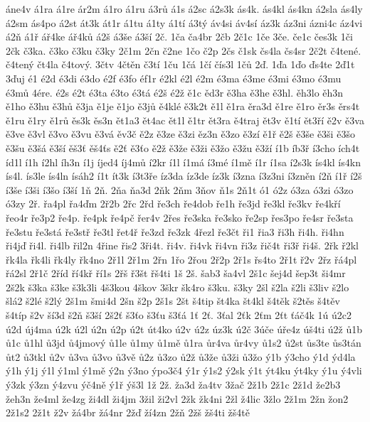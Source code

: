 {áne4v
á1ra
á1re
ár2m
á1ro
á1ru
á3rů
á1s
á2sc
á2s3k
ás4k.
ás4kl
ás4kn
á2sla
ás4ly
á2sm
ás4po
á2st
át3k
át1r
á1tu
á1ty
á1tí
á3tý
áv4si
áv4sí
áz3k
áz3ni
ázni4c
áz4vi
á2ň
á1ř
ář4ke
ář4ků
á2š
á3še
á3ší
2č.
1ča
ča4br
2čb
2č1c
1če
3če.
če1c
čes3k
1či
2čk
č3ka.
č3ko
č3ku
č3ky
2č1m
2čn
č2ne
1čo
č2p
2čs
č1sk
čs4la
čs4sr
2č2t
č4tené.
č4tený
čt4la
č4tový.
3čtv
4čtěn
č3tí
1ču
1čá
1čí
čís3l
1čů
2ď.
1ďa
1ďo
ďs4te
2ď1t
3ďuj
é1
é2d
é3di
é3do
é2f
é3fo
éf1r
é2kl
é2l
é2m
é3ma
é3me
é3mi
é3mo
é3mu
é3mů
4ére.
é2s
é2t
é3ta
é3to
é3tá
é2š
é2ž
ě1c
ěd3r
ě3ha
ě3he
ě3hl.
ěh3lo
ěh3n
ě1ho
ě3hu
ě3hů
ě3ja
ě1je
ě1jo
ě3jů
ě4klé
ě3k2t
ě1l
ě1ra
ěra3d
ě1re
ě1ro
ěr3s
ěrs4t
ě1ru
ě1ry
ě1rů
ěs3k
ěs3n
ět1a3
ět4ac
ět1l
ě1tr
ět3ra
ě4traj
ět3v
ě1tí
ět3ří
ě2v
ě3va
ě3ve
ě3vl
ě3vo
ě3vu
ě3vá
ěv3č
ě2z
ě3ze
ě3zi
ěz3n
ě3zo
ě3zí
ě1ř
ě2š
ě3še
ě3ši
ě3šo
ě3šu
ě3šá
ě3ší
ěš3ť
ěš4ťs
ě2ť
ě3ťo
ě2ž
ě3že
ě3ži
ě3žo
ě3žu
ě3ží
í1b
íb3ř
í3cho
ích4t
íd1l
í1h
í2hl
íh3n
í1j
íjed4
íj4mů
í2kr
í1l
í1má
í3mé
í1mě
í1r
í1sa
í2s3k
ís4kl
ís4kn
ís4l.
ís3le
ís4ln
ísáh2
í1t
ít3k
í3t3ře
íz3da
íz3de
íz3k
í3zna
í3z3ni
í3zněn
í2ň
í1ř
í2š
í3še
í3ši
í3šo
í3ší
1ň
2ň.
2ňa
ňa3d
2ňk
2ňm
3ňov
ň1s
2ň1t
ó1
ó2z
ó3za
ó3zi
ó3zo
ó3zy
2ř.
řa4pl
řa4ďm
2ř2b
2řc
2řd
ře3ch
ře4dob
ře1h
ře3jd
ře3kl
ře3kv
ře4kří
řeo4r
ře3p2
ře4p.
ře4pk
ře4pč
řer4v
2řes
ře3ska
ře3sko
ře2sp
řes3po
ře4sr
ře3sta
ře3stu
ře3stá
ře3stř
ře3tl
řet4ř
ře3zd
ře3zk
4řezl
ře3čt
ři1
řia3
ři3h
ři4h.
ři4hn
ři4jď
ři4l.
ři4lb
řil2n
4řine
řis2
3ři4t.
ři4v.
ři4vk
ři4vn
ři3z
řič4t
ři3ř
ři4š.
2řk
ř2kl
řk4la
řk4li
řk4ly
řk4no
2ř1l
2ř1m
2řn
1řo
2řou
2ř2p
2ř1s
řs4to
2ř1t
ř2v
2řz
řá4pl
řá2sl
2ř1č
2říd
ří4kř
ří1s
2řš
ř3št
řš4ti
1š
2š.
šab3
ša4vl
2š1c
šej4d
šep3t
ši4mr
2š2k
š3ka
š3ke
š3k3li
4š3kou
4škov
3škr
šk4ro
š3ku.
š3ky
2šl
š2la
š2li
š3liv
š2lo
šlá2
š2lé
š2lý
2š1m
šmi4d
2šn
š2p
2š1s
2št
š4tip
št4ka
št4kl
š4těk
š2těs
š4těv
š4típ
š2v
ší3d
š2ň
š3ší
2š2ť
š3ťo
š3ťu
š3ťá
1ť
2ť.
3ťal
2ťk
2ťm
2ťt
ťáč4k
1ú
ú2c2
ú2d
új4ma
ú2k
ú2l
ú2n
ú2p
ú2t
út4ko
ú2v
ú2z
úz3k
ú2č
3úče
úře4z
úš4ti
ú2ž
ů1b
ů1c
ů1hl
ů3jd
ů4jmový
ů1le
ů1my
ů1mě
ů1ra
ůr4va
ůr4vy
ů1s2
ů2st
ůs3te
ůs3tán
ůt2
ů3tkl
ů2v
ů3va
ů3vo
ů3vě
ů2z
ů3zo
ů2ž
ů3že
ů3ži
ů3žo
ý1b
ý3cho
ý1d
ýd4la
ý1h
ý1j
ý1l
ý1ml
ý1mě
ý2n
ý3no
ýpo3č4
ý1r
ý1s2
ý2sk
ý1t
ýt4ku
ýt4ky
ý1u
ý4vli
ý3zk
ý3zn
ý4zvu
ýč4ně
ý1ř
ýš3l
1ž
2ž.
ža3d
ža4tv
3žač
2ž1b
2ž1c
2ž1d
že2b3
žeh3n
že4ml
že4zg
ži4dl
ži4jm
3žil
ži2vl
2žk
žk4ni
2žl
ž4lic
3žlo
2ž1m
2žn
žon2
2ž1s2
2ž1t
ž2v
žá4br
žá4nr
2žď
ží4zn
2žň
2žš
žš4ti
žš4tě
}
%
